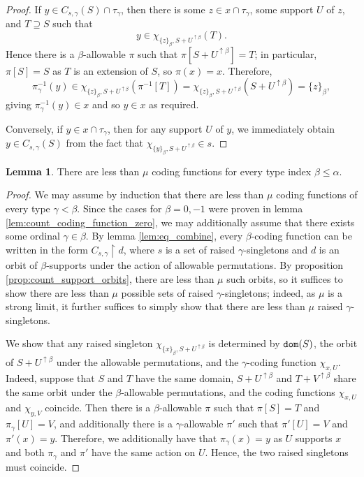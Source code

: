 \documentclass{article}
\theoremstyle{definition}
\newtheorem{lemma}[theorem]{Lemma}
\theoremstyle{remark}
\begin{document}
{\begin{proof}
  If $y \in C_{s,\gamma}(S) \cap \tau_\gamma$, then there is some $z \in x \cap \tau_\gamma$, some support $U$ of $z$, and $T \supseteq S$ such that
  $$ y \in \chi_{\{z\}_\beta,S + U^{\uparrow \beta}}(T). $$
  Hence there is a $\beta$-allowable $\pi$ such that $\pi[S + U^{\uparrow \beta}] = T$; in particular, $\pi[S] = S$ as $T$ is an extension of $S$, so $\pi(x) = x$.
  Therefore,
  $$ \pi_\gamma^{-1}(y) \in \chi_{\{z\}_\beta,S + U^{\uparrow \beta}}(\pi^{-1}[T]) = \chi_{\{z\}_\beta,S + U^{\uparrow \beta}}(S + U^{\uparrow \beta}) = \{z\}_\beta, $$
  giving $\pi_\gamma^{-1}(y) \in x$ and so $y \in x$ as required.

  Conversely, if $y \in x \cap \tau_\gamma$, then for any support $U$ of $y$, we immediately obtain $y \in C_{s,\gamma}(S)$ from the fact that $\chi_{\{y\}_\beta,S + U^{\uparrow \beta}} \in s$.
\end{proof}
\begin{lemma}\label{lem:count_coding_function}
  There are less than $\mu$ coding functions for every type index $\beta \leq \alpha$.
\end{lemma}
\begin{proof}
  We may assume by induction that there are less than $\mu$ coding functions of every type $\gamma < \beta$.
  Since the cases for $\beta = 0, -1$ were proven in lemma \ref{lem:count_coding_function_zero}, we may additionally assume that there exists some ordinal $\gamma \in \beta$.
  By lemma \ref{lem:eq_combine}, every $\beta$-coding function can be written in the form $C_{s,\gamma} \restriction d$, where $s$ is a set of raised $\gamma$-singletons and $d$ is an orbit of $\beta$-supports under the action of allowable permutations.
  By proposition \ref{prop:count_support_orbits}, there are less than $\mu$ such orbits, so it suffices to show there are less than $\mu$ possible sets of raised $\gamma$-singletons; indeed, as $\mu$ is a strong limit, it further suffices to simply show that there are less than $\mu$ raised $\gamma$-singletons.

  We show that any raised singleton $\chi_{\{x\}_\beta,S + U^{\uparrow \beta}}$ is determined by ${\tt dom}(S)$, the orbit of $S + U^{\uparrow \beta}$ under the allowable permutations, and the $\gamma$-coding function $\chi_{x,U}$.
  Indeed, suppose that $S$ and $T$ have the same domain, $S + U^{\uparrow \beta}$ and $T + V^{\uparrow \beta}$ share the same orbit under the $\beta$-allowable permutations, and the coding functions $\chi_{x,U}$ and $\chi_{y,V}$ coincide.
  Then there is a $\beta$-allowable $\pi$ such that $\pi[S] = T$ and $\pi_\gamma[U] = V$, and additionally there is a $\gamma$-allowable $\pi'$ such that $\pi'[U] = V$ and $\pi'(x) = y$.
  Therefore, we additionally have that $\pi_\gamma(x) = y$ as $U$ supports $x$ and both $\pi_\gamma$ and $\pi'$ have the same action on $U$.
  Hence, the two raised singletons must coincide.


\end{proof}}
\end{document}
